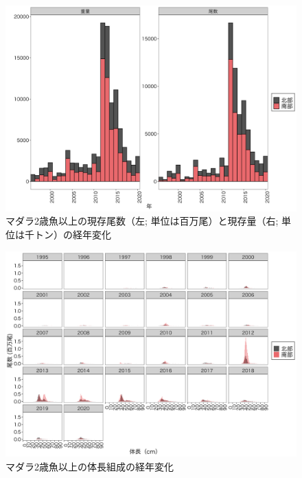 \documentclass[11pt]{article} %
\begin{document}
\begin{linenumbers}
\begin{figure}[h]
  \centering
  \includegraphics[width = 14cm]{マダラ２＋trend.png}
  \caption{マダラ2歳魚以上の現存尾数（左; 単位は百万尾）と現存量（右; 単位は千トン）の経年変化}
\end{figure}

\begin{figure}[h]
  \centering
  \includegraphics[width = 14cm]{マダラ2+length.png}
  \caption{マダラ2歳魚以上の体長組成の経年変化}
\end{figure}


\end{linenumbers}
\end{document}

